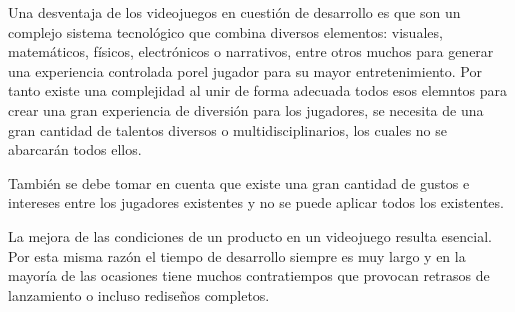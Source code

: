 
Una desventaja de los videojuegos en cuestión de desarrollo es que son un complejo sistema tecnológico que combina diversos elementos: visuales, matemáticos, físicos, electrónicos o narrativos, entre otros muchos para generar una experiencia controlada porel jugador para su mayor entretenimiento. Por tanto existe una complejidad al unir de forma adecuada todos esos elemntos para crear una gran experiencia de diversión para los jugadores, se necesita de una gran cantidad de talentos diversos o multidisciplinarios, los cuales no se abarcarán todos ellos.

También se debe tomar en cuenta que existe una gran cantidad de gustos e intereses entre los jugadores existentes y no se puede aplicar todos los existentes.

La mejora de las condiciones de un producto en un videojuego resulta esencial. Por esta misma razón el tiempo de desarrollo siempre es muy largo y en la mayoría de las ocasiones tiene muchos contratiempos que provocan retrasos de lanzamiento o incluso rediseños completos.



